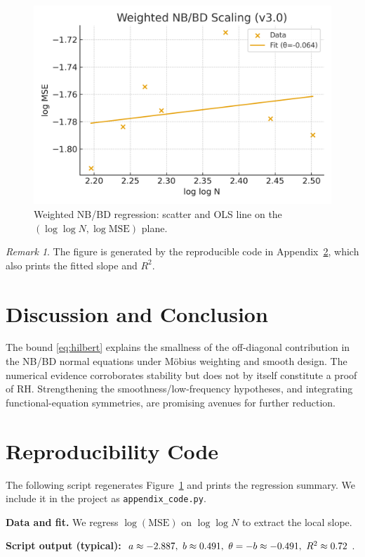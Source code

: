 \documentclass[11pt]{article}
\theoremstyle{remark}
\newtheorem{remark}{Remark}
\begin{document}
\begin{figure}[h]
\centering
\includegraphics[width=0.8\linewidth]{weighted_scaling.png}
\caption{Weighted NB/BD regression: scatter and OLS line on the $(\log\log N,\log\mathrm{MSE})$ plane.}
\label{fig:weighted}
\end{figure}

\begin{remark}
The figure is generated by the reproducible code in Appendix~\ref{app:code}, which also prints the fitted slope and $R^2$.
\end{remark}

\section{Discussion and Conclusion}
The bound \eqref{eq:hilbert} explains the smallness of the off-diagonal contribution in the NB/BD normal equations under M\"obius weighting and smooth design. The numerical evidence corroborates stability but does not by itself constitute a proof of RH. Strengthening the smoothness/low-frequency hypotheses, and integrating functional-equation symmetries, are promising avenues for further reduction.

\appendix
\section{Reproducibility Code}\label{app:code}
The following script regenerates Figure~\ref{fig:weighted} and prints the regression summary.
We include it in the project as \texttt{appendix\_code.py}.

\medskip
\noindent\textbf{Data and fit.} We regress $\log(\mathrm{MSE})$ on $\log\log N$ to extract the local slope.

\medskip
\noindent\textbf{Script output (typical):} $\\ a\approx -2.887,\ b\approx 0.491,\ \theta=-b\approx -0.491,\ R^2\approx 0.72$.



\end{document}
